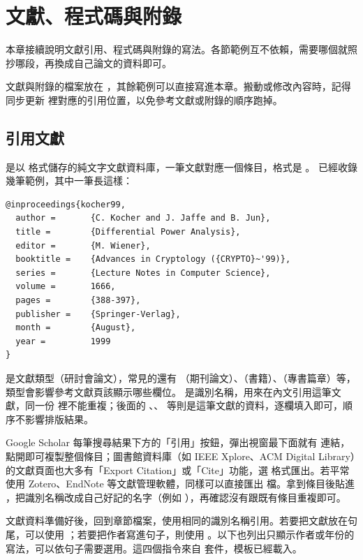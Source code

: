 \chapter{文獻、程式碼與附錄}\label{cha:refs}

本章接續說明文獻引用、程式碼與附錄的寫法。各節範例互不依賴，需要哪個就照抄哪段，再換成自己論文的資料即可。

文獻與附錄的檔案放在 ，其餘範例可以直接寫進本章。搬動或修改內容時，記得同步更新  裡對應的引用位置，以免參考文獻或附錄的順序跑掉。

\section{引用文獻}

 是以 \BibTeX{} 格式儲存的純文字文獻資料庫，一筆文獻對應一個條目，格式是 。 已經收錄幾筆範例，其中一筆長這樣：

\begin{lstlisting}
@inproceedings{kocher99,
  author =       {C. Kocher and J. Jaffe and B. Jun},
  title =        {Differential Power Analysis},
  editor =       {M. Wiener},
  booktitle =    {Advances in Cryptology ({CRYPTO}~'99)},
  series =       {Lecture Notes in Computer Science},
  volume =       1666,
  pages =        {388-397},
  publisher =    {Springer-Verlag},
  month =        {August},
  year =         1999
}
\end{lstlisting}

 是文獻類型（研討會論文），常見的還有 （期刊論文）、（書籍）、（專書篇章）等，類型會影響參考文獻頁該顯示哪些欄位。 是識別名稱，用來在內文引用這筆文獻，同一份  裡不能重複；後面的 、、 等則是這筆文獻的資料，逐欄填入即可，順序不影響排版結果。

Google Scholar 每筆搜尋結果下方的「引用」按鈕，彈出視窗最下面就有 \BibTeX{} 連結，點開即可複製整個條目；圖書館資料庫（如 IEEE Xplore、ACM Digital Library）的文獻頁面也大多有「Export Citation」或「Cite」功能，選 \BibTeX{} 格式匯出。若平常使用 Zotero、EndNote 等文獻管理軟體，同樣可以直接匯出  檔。拿到條目後貼進 ，把識別名稱改成自己好記的名字（例如 ），再確認沒有跟既有條目重複即可。

文獻資料準備好後，回到章節檔案，使用相同的識別名稱引用。若要把文獻放在句尾，可以使用 \code{\citep}；若要把作者寫進句子，則使用 \code{\citet}。以下也列出只顯示作者或年份的寫法，可以依句子需要選用。這四個指令來自  套件，模板已經載入。

